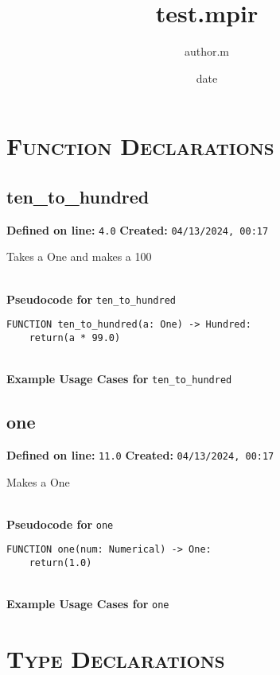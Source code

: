 \documentclass{article}
\title{test.mpir}
\author{author.m}
\date{date}
\begin{document}
\maketitle
\clearpage
\tableofcontents
\clearpage

\section{\textsc{Function Declarations}}

\subsection{ten\_to\_hundred}

\textbf{Defined on line:} \verb|4.0| \hfill \textbf{Created:} \verb|04/13/2024, 00:17| 


Takes a One and makes a 100

\textbf{\\ Pseudocode for } \texttt{ten\_to\_hundred}
\begin{verbatim}
FUNCTION ten_to_hundred(a: One) -> Hundred:
	return(a * 99.0)
\end{verbatim}

\textbf{\\ Example Usage Cases for } \texttt{ten\_to\_hundred}
\clearpage

\subsection{one}

\textbf{Defined on line:} \verb|11.0| \hfill \textbf{Created:} \verb|04/13/2024, 00:17| 


Makes a One

\textbf{\\ Pseudocode for } \texttt{one}
\begin{verbatim}
FUNCTION one(num: Numerical) -> One:
	return(1.0)
\end{verbatim}

\textbf{\\ Example Usage Cases for } \texttt{one}
\clearpage

\section{\textsc{Type Declarations}}
\end{document}
